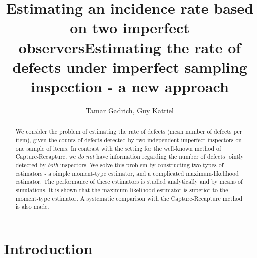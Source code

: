 \documentclass[a4paper,10pt,twoside]{article}
\title{Estimating an incidence rate based on two imperfect observers}
\author{Tamar Gadrich{\footnotemark[1]},\; Guy Katriel{\footnotemark[2]}}
\date{}
\begin{document}
	


\title{Estimating the rate of defects under imperfect sampling inspection - a new approach%
}






\maketitle
\renewcommand{\thefootnote}{\fnsymbol{footnote}}

\begin{abstract}
	We consider the problem of estimating the rate of defects (mean
	number of defects per item), given the counts of defects detected by two independent imperfect inspectors on one sample of items. In contrast with the setting for the well-known method
	of Capture-Recapture, we {\it{do not}} have information 
	regarding the number of defects jointly detected by {\it{both}} inspectors. 
	We solve this problem by constructing two types of estimators - a simple moment-type estimator, and a complicated maximum-likelihood estimator.
	The performance of these estimators is studied analytically and by means of simulations. It is shown that the 
	maximum-likelihood estimator is superior to the moment-type estimator. A systematic comparison
	with the Capture-Recapture method is also made.
	
	
\end{abstract}

\section{Introduction}
\end{document}
